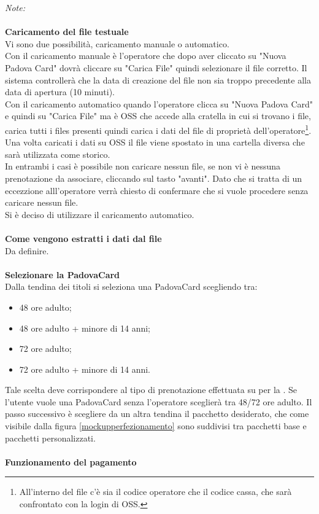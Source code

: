 \textit{Note:}\\ \\
\textbf{Caricamento del file testuale}\\

Vi sono due possibilità, caricamento manuale o automatico.\\
Con il caricamento manuale è l'operatore che dopo aver cliccato su "Nuova Padova Card" dovrà cliccare su "Carica File" quindi selezionare il file corretto.
Il sistema controllerà che la data di creazione del file non sia troppo precedente alla data di apertura (10 minuti). \\

Con il caricamento automatico quando l'operatore clicca su "Nuova Padova Card" e quindi su "Carica File" ma è OSS che accede alla cratella in cui si trovano i file, carica tutti i files presenti quindi carica i dati del file di proprietà dell'operatore\footnote{All'interno del file c'è sia il codice operatore che il codice cassa, che sarà confrontato con la login di OSS.}. Una volta caricati i dati su OSS il file viene spostato in una cartella diversa che sarà utilizzata come storico.\\ 

In entrambi i casi è possibile non caricare nessun file, se non vi è nessuna prenotazione da associare, cliccando sul tasto "avanti". Dato che si tratta di un eccezzione alll'operatore verrà chiesto di confermare che si vuole procedere senza caricare nessun file.\\

Si è deciso di utilizzare il caricamento automatico.\\ \\
\textbf{Come vengono estratti i dati dal file} \\ 
Da definire.\\ \\ %
\textbf{Selezionare la PadovaCard} \\

Dalla tendina dei titoli si seleziona una PadovaCard scegliendo tra:
\begin{itemize}
\item 48 ore adulto;
\item 48 ore adulto + minore di 14 anni;
\item 72 ore adulto;
\item 72 ore adulto + minore di 14 anni.
\end{itemize}
Tale scelta deve corrispondere al tipo di prenotazione effettuata su \tlite per la \cappella. Se l'utente vuole una PadovaCard senza \cappella l'operatore sceglierà tra 48/72 ore adulto.
Il passo successivo è scegliere da un altra tendina il pacchetto desiderato, che come visibile dalla figura \ref{mockupperfezionamento} sono suddivisi tra pacchetti base e pacchetti personalizzati.\\ \\
\textbf{Funzionamento del pagamento} \\

